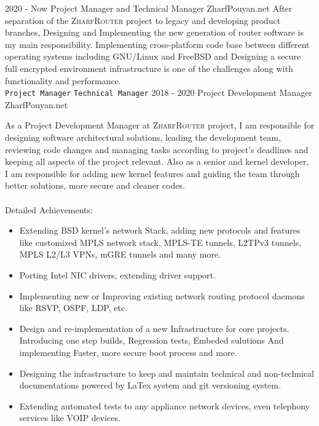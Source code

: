\documentclass[12pt]{developercv}
\begin{document}
\begin{entrylist}
	\entry
		{2020 - Now}
		{Project Manager and Technical Manager}
		{ZharfPouyan.net}
		{
		After separation of the \textsc{ZharfRouter} project to legacy and
		developing product branches, Designing and Implementing the new 
		generation of router software is my main responsibility. Implementing
		cross-platform code base between different operating systems including
		GNU/Linux and FreeBSD and Designing a secure full encrypted
		environment infrastructure is one of the challenges along with
		functionality and performance. \\
		\texttt{Project Manager}\slashsep
		\texttt{Technical Manager}
		}
		\nopagebreak
	\entry
		{2018 - 2020}
		{Project Development Manager}
		{ZharfPouyan.net}
		{
		As a Project Development Manager at \textsc{ZharfRouter} project,
		I am responsible for designing software architectural solutions,
		leading the development team, reviewing code changes and managing
		tasks according to project's deadlines and keeping all aspects of
		the project relevant. Also as a senior and kernel developer,
		I am responsible for adding new kernel features and guiding the
		team through better solutions, more secure and cleaner codes.
		\\
		\\
		Detailed Achievements:
		\begin{itemize}
			\item Extending BSD kernel's network Stack, adding new protocols
			      and features like customized MPLS network stack,
			      MPLS-TE tunnels, L2TPv3 tunnels, MPLS L2/L3 VPNs,
			      mGRE tunnels and many more.
			\item Porting Intel NIC drivers, extending driver support.
			\item Implementing new or Improving existing network routing
			      protocol daemons like RSVP, OSPF, LDP, etc.
			\item Design and re-implementation of a new Infrastructure for
				  core projects. Introducing one step builds, Regression tests,
				  Embeded sulutions And implementing Faster, more secure boot
				  process and more.
			\item Designing the infrastructure to keep and maintain technical and
				  non-technical documentations powered by LaTex system and
				  git versioning system.
			\item Extending automated tests to any appliance network devices,
				  even telephony services like VOIP devices.

\end{itemize}}
\end{entrylist}
\end{document}
